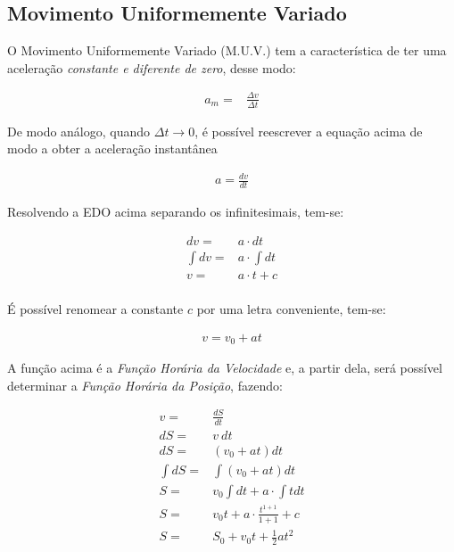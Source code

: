 \subsection{Movimento Uniformemente Variado}

O Movimento Uniformemente Variado (M.U.V.) tem a característica de ter uma aceleração \textit{constante e diferente de zero}, desse modo:

\begin{ceqn}
    \begin{align*}
        a_m =& \frac{\Delta v}{\Delta t}
    \end{align*}
\end{ceqn}

De modo análogo, quando $\Delta t \rightarrow 0$, é possível reescrever a equação acima de modo a obter a aceleração instantânea

\begin{ceqn}
    \begin{align*}
        a = \frac{dv}{dt}
    \end{align*}
\end{ceqn}

Resolvendo a EDO acima separando os infinitesimais, tem-se:

\begin{ceqn}
    \begin{align*}
        dv =& a \cdot dt \\
        \int dv =& a \cdot \int dt \\
        v =& a \cdot t + c\\
    \end{align*}
\end{ceqn}

É possível renomear a constante $c$ por uma letra conveniente, tem-se:

\begin{ceqn}
    \begin{align*}
        v = v_0 + at
    \end{align*}
\end{ceqn}

A função acima é a \textit{Função Horária da Velocidade} e, a partir dela, será possível determinar a \textit{Função Horária da Posição}, fazendo:

\begin{ceqn}
    \begin{align*}
        v =& \frac{dS}{dt} \\
        dS =& v \ dt \\
        dS =& (v_0 + at) dt \\
        \int dS =& \int (v_0 + at) dt \\
        S =& v_0 \int dt + a \cdot \int t dt \\
        S =& v_0 t + a \cdot \frac{t^{1+1}}{1+1} + c \\
        S =& S_0 + v_0 t + \frac{1}{2} a t^2 \\
    \end{align*}
\end{ceqn}

